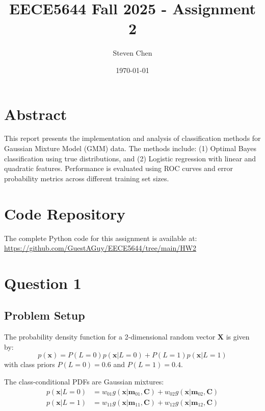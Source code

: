 \documentclass[12pt]{article}
\title{EECE5644 Fall 2025 - Assignment 2}
\author{Steven Chen}
\date{\today}
\begin{document}
\maketitle

\section*{Abstract}
This report presents the implementation and analysis of classification methods for Gaussian Mixture Model (GMM) data. The methods include: (1) Optimal Bayes classification using true distributions, and (2) Logistic regression with linear and quadratic features. Performance is evaluated using ROC curves and error probability metrics across different training set sizes.

\section*{Code Repository}
The complete Python code for this assignment is available at: \\
\url{https://github.com/GuestAGuy/EECE5644/tree/main/HW2}

\newpage

\section{Question 1}

\subsection{Problem Setup}
The probability density function for a 2-dimensional random vector $\mathbf{X}$ is given by:
\[
p(\mathbf{x}) = P(L=0)p(\mathbf{x}|L=0) + P(L=1)p(\mathbf{x}|L=1)
\]
with class priors $P(L=0)=0.6$ and $P(L=1)=0.4$.

The class-conditional PDFs are Gaussian mixtures:
\begin{align*}
p(\mathbf{x}|L=0) &= w_{01}g(\mathbf{x}|\mathbf{m}_{01},\mathbf{C}) + w_{02}g(\mathbf{x}|\mathbf{m}_{02},\mathbf{C}) \\
p(\mathbf{x}|L=1) &= w_{11}g(\mathbf{x}|\mathbf{m}_{11},\mathbf{C}) + w_{12}g(\mathbf{x}|\mathbf{m}_{12},\mathbf{C})
\end{align*}
\end{document}
